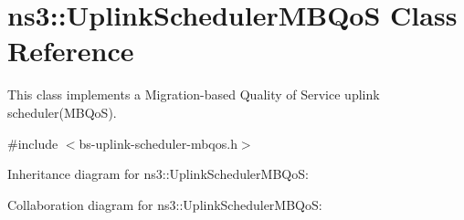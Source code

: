 \hypertarget{classns3_1_1UplinkSchedulerMBQoS}{}\section{ns3\+:\+:Uplink\+Scheduler\+M\+B\+QoS Class Reference}
\label{classns3_1_1UplinkSchedulerMBQoS}


This class implements a Migration-\/based Quality of Service uplink scheduler(\+M\+B\+Qo\+S).  




{\ttfamily \#include $<$bs-\/uplink-\/scheduler-\/mbqos.\+h$>$}



Inheritance diagram for ns3\+:\+:Uplink\+Scheduler\+M\+B\+QoS\+:


Collaboration diagram for ns3\+:\+:Uplink\+Scheduler\+M\+B\+QoS\+:
